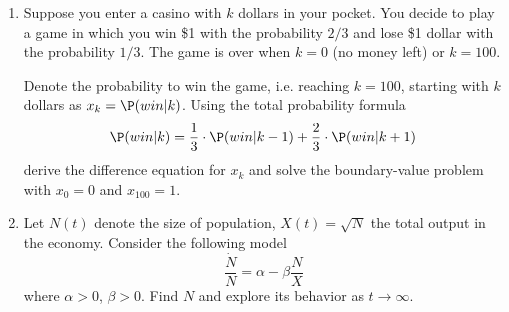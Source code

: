 \begin{enumerate}[resume]
\item Suppose you enter a casino with $k$ dollars in your pocket. You decide to play a game in which you win \$1 with the probability  $2/3$ and lose \$1 dollar with the probability $1/3$. The game is over when $k=0$ (no money left) or $k=100$.

Denote the probability to win the game, i.e. reaching $k=100$, starting with $k$ dollars as $x_k=\P(win|k)$. Using the total probability formula
\[
\P(win|k)=\frac{1}{3} \cdot \P(win|k-1)+\frac{2}{3} \cdot \P(win|k+1)
\]
derive the difference equation for $x_k$ and solve the boundary-value problem with $x_0=0$ and $x_{100}=1$.

\item Let $N(t)$ denote the size of population, $X(t)=\sqrt{N}$ the total output in the economy. Consider the following model
\[
\frac{\dot{N}}{N}=\alpha-\beta\frac{N}{X}
\]
where $\alpha>0$, $\beta>0$. Find $N$ and explore its behavior as $t\to\infty$.
\end{enumerate}

